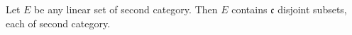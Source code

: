 Let $E$ be any linear set of second category. Then $E$ contains $\mathfrak{c}$ disjoint subsets, each of second category.
